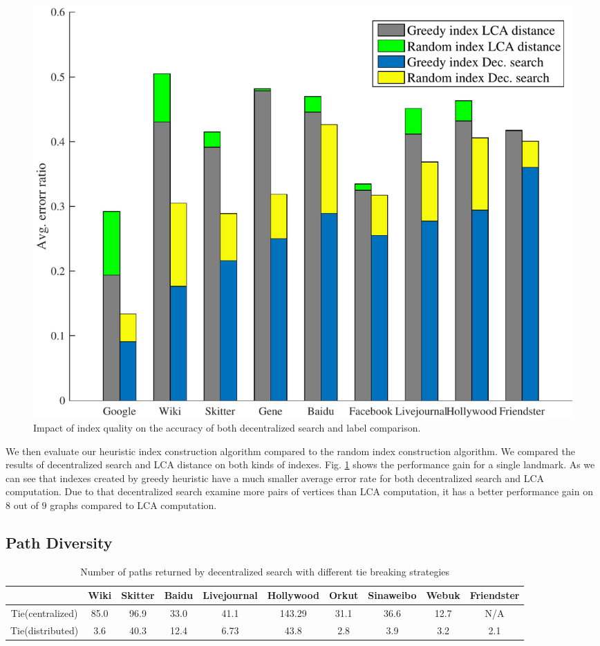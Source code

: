 \begin{figure}[t]
    \centering
    \includegraphics[width=\linewidth]{./figures/accuracy_index.pdf}
    \caption{Impact of index quality on the accuracy of both decentralized search and label comparison.}
    \label{fig:accuracy_index}
\end{figure}

We then evaluate our heuristic index construction algorithm compared to the random index construction algorithm. We compared the results of decentralized search and LCA distance on both kinds of indexes. Fig. \ref{fig:accuracy_index} shows the performance gain for a single landmark. As we can see that indexes created by greedy heuristic have a much smaller average error rate for both decentralized search and LCA computation. Due to that decentralized search examine more pairs of vertices than LCA computation, it has a better performance gain on $8$ out of $9$ graphs compared to LCA computation.

\subsection{Path Diversity}
\label{eval_diversity}

\begin{table} [ht]
    \centering
    \begin{tabular}{cccccccccc} \hline
				&Wiki&Skitter&Baidu&Livejournal&Hollywood&Orkut&Sinaweibo&Webuk&Friendster \\ \hline
				Tie(centralized)&85.0&96.9&33.0&41.1&143.29&31.1&36.6&12.7&N/A \\ \hline
				Tie(distributed)&3.6&40.3&12.4&6.73&43.8&2.8&3.9&3.2&2.1 \\ \hline
    \end{tabular}
    \caption{Number of paths returned by decentralized search with different tie breaking strategies}
    \label{table:NOP}
\end{table}

